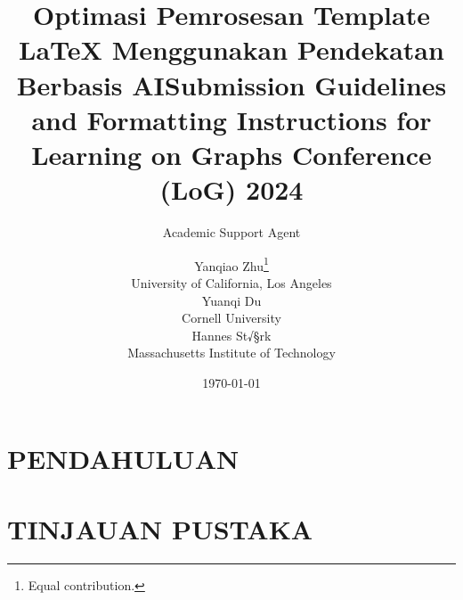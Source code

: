 \documentclass{article}
\title{Optimasi Pemrosesan Template LaTeX Menggunakan Pendekatan Berbasis AI}
\author{Academic Support Agent}
\date{\today}
\begin{document}
\maketitle

\begin{abstract}

\end{abstract}

\chapter{PENDAHULUAN}


\chapter{TINJAUAN PUSTAKA}


\usepackage{log_2024}						%

\usepackage{booktabs}						%
\usepackage{multirow}						%
\usepackage{amsfonts}						%
\usepackage{graphicx}						%
\usepackage{duckuments}						%

\usepackage[numbers,compress,sort]{natbib}	%

% 

\title[Submission Guidelines and Formatting Instructions for LoG Conference 2024]{Submission Guidelines and Formatting Instructions for Learning on Graphs Conference (LoG) 2024}

\author[Y. Zhu et al.]{%
Yanqiao Zhu\thanks{Equal contribution.}\\
University of California, Los Angeles\\
\And
Yuanqi Du\footnotemark[1]\\
Cornell University\\
\And
Hannes St√§rk\\
Massachusetts Institute of Technology\\
}
\end{document}
